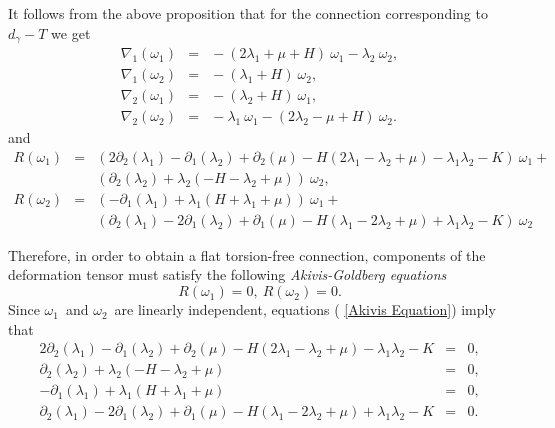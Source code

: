 \documentclass{article}
\begin{document}
It follows from the above proposition that for the connection corresponding
to $d_{\gamma }-T$ we get
\begin{eqnarray*}
\nabla _{1}\left( \omega _{1}\right) &\!\!\!\!=&\!\!\!\!-\left( 2\lambda
_{1}+\mu +H\right) ~\omega _{1}-\lambda _{2}~\omega _{2}, \\
\nabla _{1}\left( \omega _{2}\right) &\!\!\!\!=&\!\!\!\!-(\lambda
_{1}+H)~\omega _{2}, \\
\nabla _{2}\left( \omega _{1}\right) &\!\!\!\!=&\!\!\!\!-\left( \lambda
_{2}+H\right) ~\omega _{1}, \\
\nabla _{2}\left( \omega _{2}\right) &\!\!\!\!=&\!\!\!\!-\lambda _{1}~\omega
_{1}-\left( 2\lambda _{2}-\mu +H\right) ~\omega _{2}.
\end{eqnarray*}%
and
\begin{eqnarray*}
R(\omega _{1}) &\!\!\!\!=&\!\!\!\!\left( 2\partial _{2}\left( \lambda
_{1}\right) -\partial _{1}\left( \lambda _{2}\right) +\partial _{2}\left(
\mu \right) -H\left( 2\lambda _{1}-\lambda _{2}+\mu \right) -\lambda
_{1}\lambda _{2}-K\right) ~\omega _{1}+ \\
&&\left( \partial _{2}\left( \lambda _{2}\right) +\lambda _{2}\left(
-H-\lambda _{2}+\mu \right) \right) ~\omega _{2}, \\
R\left( \omega _{2}\right) &\!\!\!\!=&\!\!\!\!(-\partial _{1}\left( \lambda
_{1}\right) +\lambda _{1}\left( H+\lambda _{1}+\mu \right) )~\omega _{1}+ \\
&&\left( \partial _{2}\left( \lambda _{1}\right) -2\partial _{1}\left(
\lambda _{2}\right) +\partial _{1}\left( \mu \right) -H\left( \lambda
_{1}-2\lambda _{2}+\mu \right) +\lambda _{1}\lambda _{2}-K\right) ~\omega
_{2}
\end{eqnarray*}

Therefore, in order to obtain a flat torsion-free connection, components of
the deformation tensor must satisfy the following \emph{Akivis-Goldberg
equations}
\begin{equation}
R\left( \omega _{1}\right) =0,\ R\left( \omega _{2}\right) =0.
\label{Akivis Equation}
\end{equation}
Since $\omega _{1}$\ and $\omega _{2}$\ are linearly independent, equations (%
\ref{Akivis Equation}) imply that
\begin{eqnarray*}
2\partial _{2}\left( \lambda _{1}\right) -\partial _{1}\left( \lambda
_{2}\right) +\partial _{2}\left( \mu \right) -H\left( 2\lambda _{1}-\lambda
_{2}+\mu \right) -\lambda _{1}\lambda _{2}-K &\!\!\!\!=&\!\!\!\!0, \\
\partial _{2}\left( \lambda _{2}\right) +\lambda _{2}\left( -H-\lambda
_{2}+\mu \right) &\!\!\!\!=&\!\!\!\!0, \\
-\partial _{1}\left( \lambda _{1}\right) +\lambda _{1}\left( H+\lambda
_{1}+\mu \right) &\!\!\!\!=&\!\!\!\!0, \\
\partial _{2}\left( \lambda _{1}\right) -2\partial _{1}\left( \lambda
_{2}\right) +\partial _{1}\left( \mu \right) -H\left( \lambda _{1}-2\lambda
_{2}+\mu \right) +\lambda _{1}\lambda _{2}-K &\!\!\!\!=&\!\!\!\!0.
\end{eqnarray*}
\end{document}
